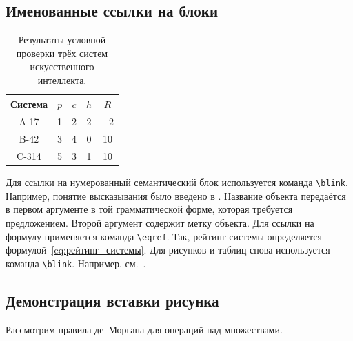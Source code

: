 \subsection{Именованные ссылки на блоки}

\begin{table}[t!]
    \caption{Результаты условной проверки трёх систем искусственного интеллекта.}
    \label{tbl:результаты_систем}
    \centering
    \begin{tabular}{|c|c|c|c|c|}
        \hline
        Система & $p$ & $c$ & $h$ & $R$ \\
        \hline
        A-17 & 1 & 2 & 2 & $-2$ \\
        \hline
        B-42 & 3 & 4 & 0 & 10 \\
        \hline
        C-314 & 5 & 3 & 1 & 10 \\
        \hline
    \end{tabular}
\end{table}

Для ссылки на нумерованный семантический блок используется команда \verb|\blink|.
Например, понятие высказывания было введено в .
Название объекта передаётся в первом аргументе в той грамматической форме, которая требуется предложением.
Второй аргумент содержит метку объекта.
Для ссылки на формулу применяется команда \verb|\eqref|.
Так, рейтинг системы определяется формулой~\eqref{eq:рейтинг_системы}.
Для рисунков и таблиц снова используется команда \verb|\blink|.
Например, см.~.

\subsection{Демонстрация вставки рисунка}

Рассмотрим правила де~Моргана для операций над множествами.

